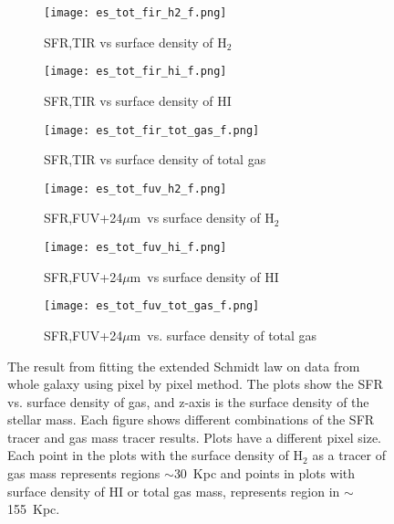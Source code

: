 \documentclass[useAMS,usenatbib]{mn2e}
\newcommand \um    {$\mu$m\ }
\begin{document}
\begin{figure*}
    \centering
    \begin{subfigure}[b]{0.3\textwidth}
        \centering
        \texttt{[image: es\_tot\_fir\_h2\_f.png]}
        \caption{SFR,TIR vs surface density of H$_2$}
        \label{fig:es,all,fir,h2}
    \end{subfigure}
    \hfill
    \begin{subfigure}[b]{0.3\textwidth}
        \centering
        \texttt{[image: es\_tot\_fir\_hi\_f.png]}
        \caption{SFR,TIR vs surface density of HI}
        \label{fig:es,all,fir,hi}
    \end{subfigure}
    \hfill
   \begin{subfigure}[b]{0.3\textwidth}
        \centering
        \texttt{[image: es\_tot\_fir\_tot\_gas\_f.png]}
        \caption{SFR,TIR vs surface density of total gas}
        \label{fig:es,all,fir,tot}
    \end{subfigure}
    \hfill
     \begin{subfigure}[b]{0.3\textwidth}
        \centering
        \texttt{[image: es\_tot\_fuv\_h2\_f.png]}
        \caption{SFR,FUV+24\um vs surface density of H$_2$}
        \label{fig:es,all,fuv,h2}
    \end{subfigure}
     \hfill
   \begin{subfigure}[b]{0.3\textwidth}
        \centering
        \texttt{[image: es\_tot\_fuv\_hi\_f.png]}
        \caption{SFR,FUV+24\um vs surface density of HI}
        \label{fig:es,all,fuv,hi}
    \end{subfigure}
    \hfill
    \begin{subfigure}[b]{0.3\textwidth}
        \centering
        \texttt{[image: es\_tot\_fuv\_tot\_gas\_f.png]}
        \caption{SFR,FUV+24\um vs. surface density of total gas}
        \label{fig:es,all,fuv,tot}
    \end{subfigure}
    \caption{The result from fitting the extended Schmidt law on data from whole galaxy using pixel by pixel method. The plots show the SFR vs. surface density of gas, and z-axis is the surface density of the stellar mass. Each figure shows different combinations of the SFR tracer and gas mass tracer results. Plots have a different pixel size. Each point in the plots with the surface density of H$_2$ as a tracer of gas mass represents regions $\sim$30~Kpc and points in plots with surface density of HI or total gas mass, represents region in $\sim$155~Kpc.}
    \label{fig:es,all}
\end{figure*}
\end{document}
